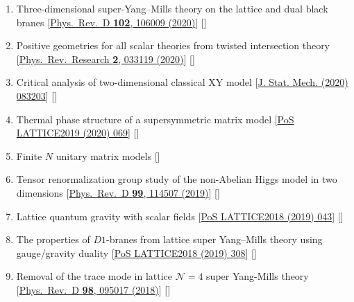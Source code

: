 \begin{enumerate}
 \item Three-dimensional super-Yang--Mills theory on the lattice and dual black branes [\href{https://journals.aps.org/prd/abstract/10.1103/PhysRevD.102.106009}{Phys.\ Rev.\ D {\bf 102}, 106009 (2020)}] [\textbf{\texttt{}}] 
 \item Positive geometries for all scalar theories from twisted intersection theory [\href{https://journals.aps.org/prresearch/abstract/10.1103/PhysRevResearch.2.033119}{Phys.\ Rev.\ Research {\bf 2}, 033119 (2020)}] [\texttt{\textbf{}}] 
  \item Critical analysis of two-dimensional classical XY model [\href{https://iopscience.iop.org/article/10.1088/1742-5468/aba686/pdf}{J. Stat. Mech. (2020) 083203}] [\texttt{\textbf{}}] 
 \item Thermal phase structure of a supersymmetric matrix model [\href{https://pos.sissa.it/363/069}{PoS LATTICE2019 (2020) 069}] [\texttt{\textbf{}}] %
 \item  Finite $N$ unitary matrix models [\textbf{\texttt{}}] 
  \item Tensor renormalization group study of the non-Abelian Higgs model in two dimensions [\href{https://journals.aps.org/prd/abstract/10.1103/PhysRevD.99.114507}{Phys.\ Rev.\ D {\bf 99}, 114507 (2019)}] [\texttt{\textbf{}}] 
 \item  Lattice quantum gravity with scalar fields [\href{https://pos.sissa.it/334/043}{PoS LATTICE2018 (2019) 043}] [\texttt{\textbf{}}] %
  \item  The properties of $D1$-branes from lattice super Yang--Mills theory using gauge/gravity duality [\href{https://pos.sissa.it/334/308}{PoS LATTICE2018 (2019) 308}]   [\texttt{\textbf{}}] %
  \item  Removal of the trace mode in lattice $\mathcal{N }= 4$ super Yang-Mills theory [\href{https://journals.aps.org/prd/abstract/10.1103/PhysRevD.98.095017}{Phys.\ Rev.\ D {\bf 98}, 095017 (2018)}] [\texttt{\textbf{\texttt{}}}]  

\end{enumerate}
